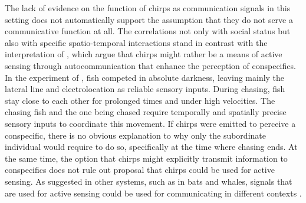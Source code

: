 The lack of evidence on the function of chirps as communication signals in this
setting does not automatically support the assumption that they do not serve a
communicative function at all. The correlations not only with social status but
also with specific spatio-temporal interactions stand in contrast with the
interpretation of \textcite{obotiWhyBrownGhost2023}, which argue that chirps
might rather be a means of active sensing through autocommunication that
enhance the perception of conspecifics. In the experiment of
\textcite{raabElectrocommunicationSignalsIndicate2021}, fish competed in
absolute darkness, leaving mainly the lateral line and electrolocation as
reliable sensory inputs. During chasing, fish stay close to each other for
prolonged times and under high velocities. The chasing fish and the one being
chased require temporally and spatially precise sensory inputs to coordinate
this movement. If chirps were emitted to perceive a conspecific, there is no
obvious explanation to why only the subordinate individual would require to do
so, specifically at the time where chasing ends. At the same time, the option
that chirps might explicitly transmit information to conspecifics does not rule
out \textcite{obotiWhyBrownGhost2023} proposal that chirps could be used for
active sensing. As suggested in other systems, such as in bats and whales,
signals that are used for active sensing could be used for communicating in
different contexts \parencite{mossAdaptiveEcholocationBehavior2023}.

